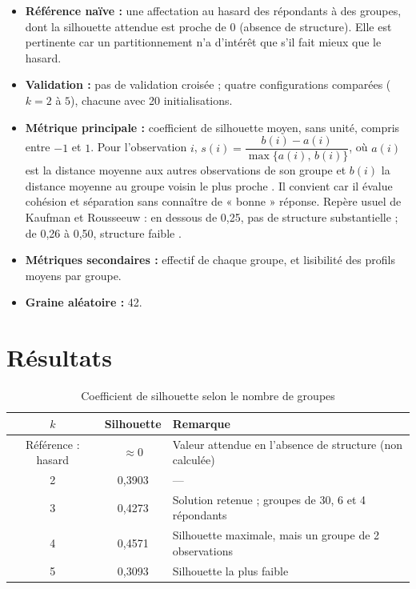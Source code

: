 \documentclass[11pt,a4paper]{article}
\begin{document}
\begin{itemize}
  \item \textbf{Référence naïve :} une affectation au hasard des répondants à des groupes, dont la silhouette attendue est proche de 0 (absence de structure). Elle est pertinente car un partitionnement n'a d'intérêt que s'il fait mieux que le hasard.
  \item \textbf{Validation :} pas de validation croisée ; quatre configurations comparées ($k = 2$ à $5$), chacune avec 20 initialisations.
  \item \textbf{Métrique principale :} coefficient de silhouette moyen, sans unité, compris entre $-1$ et $1$. Pour l'observation $i$, $s(i) = \dfrac{b(i) - a(i)}{\max\{a(i),\,b(i)\}}$, où $a(i)$ est la distance moyenne aux autres observations de son groupe et $b(i)$ la distance moyenne au groupe voisin le plus proche \cite{rousseeuw1987}. Il convient car il évalue cohésion et séparation sans connaître de « bonne » réponse. Repère usuel de Kaufman et Rousseeuw : en dessous de 0,25, pas de structure substantielle ; de 0,26 à 0,50, structure faible \cite{kr1990}.
  \item \textbf{Métriques secondaires :} effectif de chaque groupe, et lisibilité des profils moyens par groupe.
  \item \textbf{Graine aléatoire :} 42.
\end{itemize}

\section{Résultats}
\label{sec:resultats}
\begin{table}[htbp]
  \centering
  \caption{Coefficient de silhouette selon le nombre de groupes}
  \label{tab:resultats}
  \small
  \begin{tabular}{@{}c c P{9cm}@{}}
    \toprule
    $k$ & Silhouette & Remarque \\
    \midrule
    Référence : hasard & $\approx 0$ & Valeur attendue en l'absence de structure (non calculée) \\
    2 & 0,3903 & --- \\
    3 & 0,4273 & Solution retenue ; groupes de 30, 6 et 4 répondants \\
    4 & 0,4571 & Silhouette maximale, mais un groupe de 2 observations \\
    5 & 0,3093 & Silhouette la plus faible \\
    \bottomrule
  \end{tabular}
\end{table}
\end{document}
